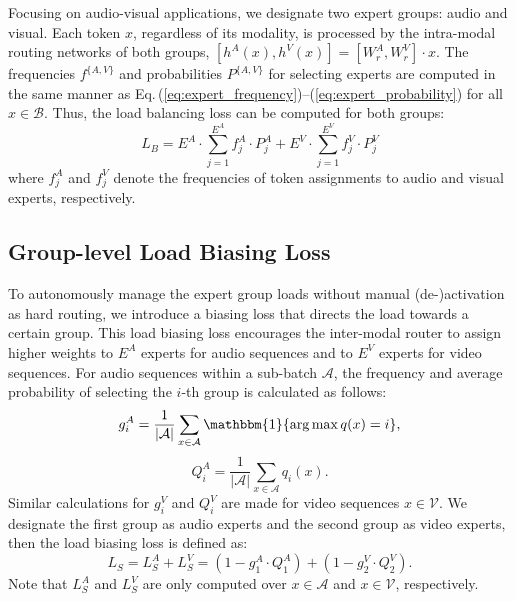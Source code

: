 Focusing on audio-visual applications, we designate two expert groups: audio and visual. Each token $x$, regardless of its modality, is processed by the intra-modal routing networks of both groups, \ie $[h^A(x), h^V(x)] = [W_r^A, W_r^V] \cdot x$. The frequencies $f^{\{A,V\}}$ and probabilities $P^{\{A,V\}}$ for selecting experts are computed in the same manner as Eq.\,(\ref{eq:expert_frequency})--(\ref{eq:expert_probability}) for all $x \in \mathcal{B}$. Thus, the load balancing loss can be computed for both groups:
\vspace*{-5pt}
\begin{equation}
L_B = E^A \cdot \sum_{j=1}^{E^A} f_j^A \cdot P_j^A + E^V \cdot \sum_{j=1}^{E^V} f_j^V \cdot P_j^V
\end{equation}
where $f_j^A$ and $f_j^V$ denote the frequencies of token assignments to audio and visual experts, respectively.


\subsection{Group-level Load Biasing Loss}
\label{subsec:load_biasing_loss}

To autonomously manage the expert group loads without manual (de-)activation as hard routing, we introduce a biasing loss that directs the load towards a certain group. This load biasing loss encourages the inter-modal router to assign higher weights to $E^A$ experts for audio sequences and to $E^V$ experts for video sequences.
For audio sequences within a sub-batch $\mathcal{A}$, the frequency and average probability of selecting the $i$-th group is calculated as follows:
\begin{equation}
    g^A_i = \frac{1}{|\mathcal{A}|} \sum_{x\in\mathcal{A}} \mathbbm{1} \{\arg\max q(x) = i\},
\end{equation}
\begin{equation}
    Q^A_i = \frac{1}{|\mathcal{A}|} \sum_{x\in\mathcal{A}} q_i(x).
\end{equation}
Similar calculations for $g^V_i$ and $Q^V_i$ are made for video sequences $x\in\mathcal{V}$. We designate the first group as audio experts and the second group as video experts, then the load biasing loss is defined as:
\begin{equation}
    L_S = L_S^A + L_S^V = (1 - g^A_1 \cdot Q^A_1) + (1 - g^V_2 \cdot Q^V_2).
\end{equation}
Note that $L_S^A$ and $L_S^V$ are only computed over $x\in\mathcal{A}$ and $x\in\mathcal{V}$, respectively. 

